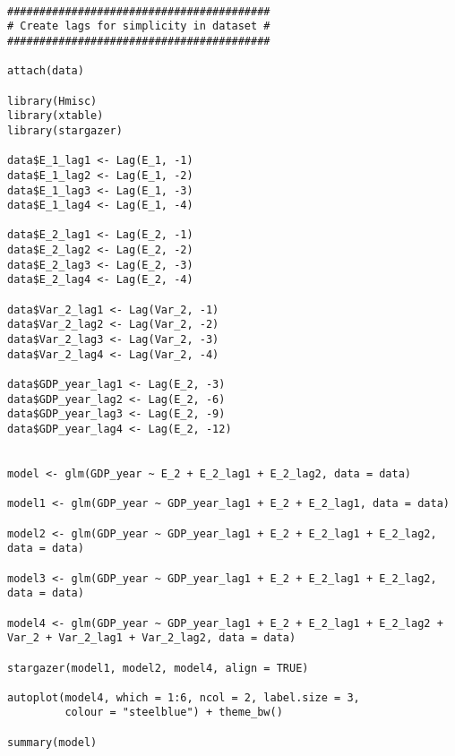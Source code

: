 \begin{lstlisting}
    



#########################################
# Create lags for simplicity in dataset #
#########################################

attach(data)

library(Hmisc)
library(xtable)
library(stargazer)

data$E_1_lag1 <- Lag(E_1, -1)
data$E_1_lag2 <- Lag(E_1, -2)
data$E_1_lag3 <- Lag(E_1, -3)
data$E_1_lag4 <- Lag(E_1, -4)

data$E_2_lag1 <- Lag(E_2, -1)
data$E_2_lag2 <- Lag(E_2, -2)
data$E_2_lag3 <- Lag(E_2, -3)
data$E_2_lag4 <- Lag(E_2, -4)

data$Var_2_lag1 <- Lag(Var_2, -1)
data$Var_2_lag2 <- Lag(Var_2, -2)
data$Var_2_lag3 <- Lag(Var_2, -3)
data$Var_2_lag4 <- Lag(Var_2, -4)

data$GDP_year_lag1 <- Lag(E_2, -3)
data$GDP_year_lag2 <- Lag(E_2, -6)
data$GDP_year_lag3 <- Lag(E_2, -9)
data$GDP_year_lag4 <- Lag(E_2, -12)


model <- glm(GDP_year ~ E_2 + E_2_lag1 + E_2_lag2, data = data)

model1 <- glm(GDP_year ~ GDP_year_lag1 + E_2 + E_2_lag1, data = data)

model2 <- glm(GDP_year ~ GDP_year_lag1 + E_2 + E_2_lag1 + E_2_lag2, data = data)

model3 <- glm(GDP_year ~ GDP_year_lag1 + E_2 + E_2_lag1 + E_2_lag2, data = data)

model4 <- glm(GDP_year ~ GDP_year_lag1 + E_2 + E_2_lag1 + E_2_lag2 + Var_2 + Var_2_lag1 + Var_2_lag2, data = data)

stargazer(model1, model2, model4, align = TRUE)

autoplot(model4, which = 1:6, ncol = 2, label.size = 3,
         colour = "steelblue") + theme_bw()

summary(model)



\end{lstlisting}